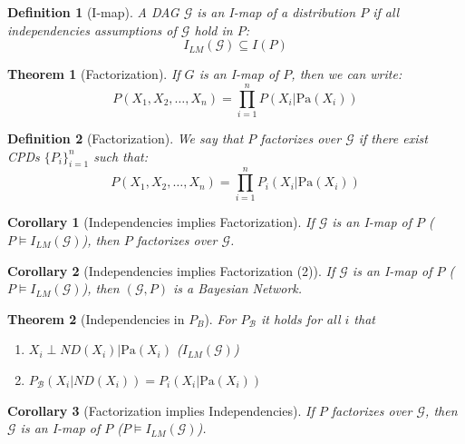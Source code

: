 \documentclass[11pt]{article}
\numberwithin{equation}{section}
\theoremstyle{boldStyle}
\theoremstyle{boldBlueStyle}
\newtheorem{corollary}{Corollary}[section]
\theoremstyle{boldPurpleStyle}
\newtheorem{theorem}{Theorem}[section]
\theoremstyle{boldRedStyle}
\newtheorem{definition}{Definition}[section]
\begin{document}
\begin{definition}[I-map]
    A DAG $\mathcal{G}$ is an I-map of a distribution $P$ if all independencies assumptions of $\mathcal{G}$ hold in $P$:
    \begin{equation*}
        I_{LM}(\mathcal{G}) \subseteq I(P)
    \end{equation*}
\end{definition}

\begin{theorem}[Factorization]
    If $G$ is an I-map of $P$, then we can write:
    \begin{equation*}
        P(X_1, X_2, \ldots, X_n) = \prod_{i=1}^{n} P(X_i | \text{Pa}(X_i))
    \end{equation*}
\end{theorem}

\begin{definition}[Factorization]
    We say that $P$ factorizes over $\mathcal{G}$ if there exist CPDs $\{ P_i \}_{i=1}^{n}$ such that:
    \begin{equation*}
        P(X_1, X_2, \ldots, X_n) = \prod_{i=1}^{n} P_i(X_i | \text{Pa}(X_i))
    \end{equation*}
\end{definition}

\begin{corollary}[Independencies implies Factorization]
    If $\mathcal{G}$ is an I-map of $P$ ($P \models I_{LM}(\mathcal{G})$), then $P$ factorizes over $\mathcal{G}$.
\end{corollary}

\begin{corollary}[Independencies implies Factorization (2)]
    If $\mathcal{G}$ is an I-map of $P$ ($P \models I_{LM}(\mathcal{G})$), then $(\mathcal{G}, P)$ is a Bayesian Network.
\end{corollary}

\begin{theorem}[Independencies in $P_B$]
    For $P_\mathcal{B}$ it holds for all $i$ that
    \begin{enumerate}
        \item $X_i \perp ND(X_i) | \text{Pa}(X_i)$  \quad  ($I_{LM}(\mathcal{G})$)
        \item $P_\mathcal{B}(X_i | ND(X_i)) = P_i(X_i | \text{Pa}(X_i))$
    \end{enumerate}
\end{theorem}

\begin{corollary}[Factorization implies Independencies]
    If $P$ factorizes over $\mathcal{G}$, then $\mathcal{G}$ is an I-map of $P$ ($P \models I_{LM}(\mathcal{G})$).
\end{corollary}
\end{document}
